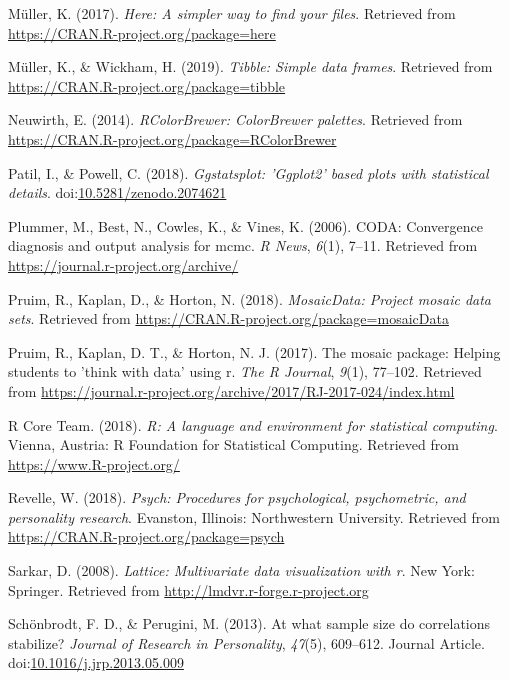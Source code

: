 \documentclass[
  man]{apa6}
\begin{document}
\leavevmode\hypertarget{ref-R-here}{}%
Müller, K. (2017). \emph{Here: A simpler way to find your files}. Retrieved from \url{https://CRAN.R-project.org/package=here}

\leavevmode\hypertarget{ref-R-tibble}{}%
Müller, K., \& Wickham, H. (2019). \emph{Tibble: Simple data frames}. Retrieved from \url{https://CRAN.R-project.org/package=tibble}

\leavevmode\hypertarget{ref-R-RColorBrewer}{}%
Neuwirth, E. (2014). \emph{RColorBrewer: ColorBrewer palettes}. Retrieved from \url{https://CRAN.R-project.org/package=RColorBrewer}

\leavevmode\hypertarget{ref-R-ggstatsplot}{}%
Patil, I., \& Powell, C. (2018). \emph{Ggstatsplot: 'Ggplot2' based plots with statistical details}. doi:\href{https://doi.org/10.5281/zenodo.2074621}{10.5281/zenodo.2074621}

\leavevmode\hypertarget{ref-R-coda}{}%
Plummer, M., Best, N., Cowles, K., \& Vines, K. (2006). CODA: Convergence diagnosis and output analysis for mcmc. \emph{R News}, \emph{6}(1), 7--11. Retrieved from \url{https://journal.r-project.org/archive/}

\leavevmode\hypertarget{ref-R-mosaicData}{}%
Pruim, R., Kaplan, D., \& Horton, N. (2018). \emph{MosaicData: Project mosaic data sets}. Retrieved from \url{https://CRAN.R-project.org/package=mosaicData}

\leavevmode\hypertarget{ref-R-mosaic}{}%
Pruim, R., Kaplan, D. T., \& Horton, N. J. (2017). The mosaic package: Helping students to 'think with data' using r. \emph{The R Journal}, \emph{9}(1), 77--102. Retrieved from \url{https://journal.r-project.org/archive/2017/RJ-2017-024/index.html}

\leavevmode\hypertarget{ref-R-base}{}%
R Core Team. (2018). \emph{R: A language and environment for statistical computing}. Vienna, Austria: R Foundation for Statistical Computing. Retrieved from \url{https://www.R-project.org/}

\leavevmode\hypertarget{ref-R-psych}{}%
Revelle, W. (2018). \emph{Psych: Procedures for psychological, psychometric, and personality research}. Evanston, Illinois: Northwestern University. Retrieved from \url{https://CRAN.R-project.org/package=psych}

\leavevmode\hypertarget{ref-R-lattice}{}%
Sarkar, D. (2008). \emph{Lattice: Multivariate data visualization with r}. New York: Springer. Retrieved from \url{http://lmdvr.r-forge.r-project.org}

\leavevmode\hypertarget{ref-Schuxf6nbrodt_Perugini_2013}{}%
Schönbrodt, F. D., \& Perugini, M. (2013). At what sample size do correlations stabilize? \emph{Journal of Research in Personality}, \emph{47}(5), 609--612. Journal Article. doi:\href{https://doi.org/10.1016/j.jrp.2013.05.009}{10.1016/j.jrp.2013.05.009}
\end{document}
